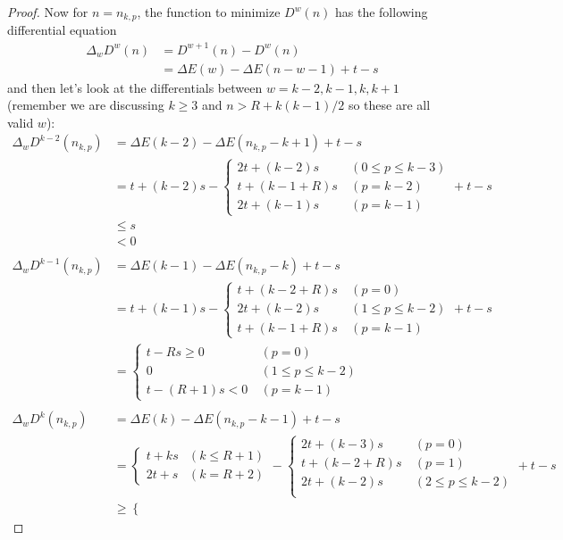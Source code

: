 \documentclass[]{article}
\begin{document}
\begin{proof}
Now for $n = n_{k, p}$, the function to minimize $D^w(n)$ has the following differential equation
\begin{align*}
\Delta_w D^w(n) &= D^{w+1}(n)-D^w(n) \\
&= \Delta E(w) - \Delta E(n-w-1) + t -s
\end{align*}
and then let's look at the differentials between $w = k-2, k-1, k, k+1$ (remember we are discussing $k\geq3$ and $n > R + k(k-1)/2 $ so these are all valid $w$):
\begin{align*}
\Delta_w D^{k-2}(n_{k,p}) &=  \Delta E(k-2) - \Delta E(n_{k,p}-k+1) + t -s \\
&= t+(k-2)s - \begin{cases}
2t + (k-2)s\ &(0\leq p \leq k-3)\\
t + (k-1+R)s\ &(p = k-2)\\
2t + (k-1)s\ &(p = k-1)
\end{cases} + t-s\\
&\leq s \\
&< 0 \\ \\
\Delta_w D^{k-1}(n_{k,p}) &=  \Delta E(k-1) - \Delta E(n_{k,p}-k) + t -s \\
&= t+(k-1)s - \begin{cases}
t + (k-2+R)s\ &(p =0)\\
2t + (k-2)s\ &(1\leq p\leq k-2)\\
t + (k-1+R)s\ &(p = k-1)
\end{cases} + t-s\\
&= \begin{cases}
t -Rs \geq 0\ &(p =0)\\
0\ &(1\leq p \leq k-2)\\
t -(R+1)s < 0\ &(p = k-1)
\end{cases}\\ \\ 
\Delta_w D^{k}(n_{k,p}) &=  \Delta E(k) - \Delta E(n_{k,p}-k-1) + t -s \\
&= \begin{cases}
t+ks &(k \leq R + 1)\\
2t+s&(k = R + 2)
\end{cases} - \begin{cases}
2t + (k-3)s\ &(p =0)\\
t + (k-2+R)s\ &(p =1)\\
2t + (k-2)s\ &(2\leq p \leq k-2)\\
\end{cases} + t-s\\
&\geq \begin{cases}

\end{cases}
\end{align*}
\end{proof}
\end{document}
